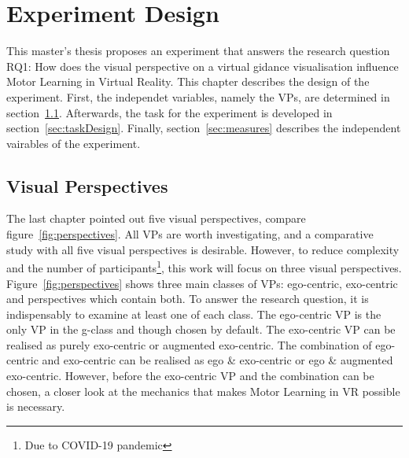 \chapter{Experiment Design}
\label{chapter:studysetting_conduction}
This master's thesis proposes an experiment that answers the research question RQ1: How does the visual perspective on a virtual gidance visualisation influence Motor Learning in Virtual Reality. This chapter describes the design of the experiment. First, the independet variables, namely the VPs, are determined in section~\ref{sec:visualPerspecticves}. Afterwards, the task for the experiment is developed in section~\ref{sec:taskDesign}. Finally, section~\ref{sec:measures} describes the independent vairables of the experiment.

\section{Visual Perspectives}
\label{sec:visualPerspecticves}
The last chapter pointed out five visual perspectives, compare figure~\ref{fig:perspectives}. All VPs are worth investigating, and a comparative study with all five visual perspectives is desirable. However, to reduce complexity and the number of participants\footnote{Due to COVID-19 pandemic}, this work will focus on three visual perspectives.\\
Figure~\ref{fig:perspectives} shows three main classes of VPs: ego-centric, exo-centric and perspectives which contain both. To answer the research question, it is indispensably to examine at least one of each class. The ego-centric VP is the only VP in the g-class and though chosen by default. The exo-centric VP can be realised as purely exo-centric or augmented exo-centric. The combination of ego-centric and exo-centric can be realised as ego \& exo-centric or ego \& augmented exo-centric. However, before the exo-centric VP and the combination can be chosen, a closer look at the mechanics that makes Motor Learning in VR possible is necessary.

